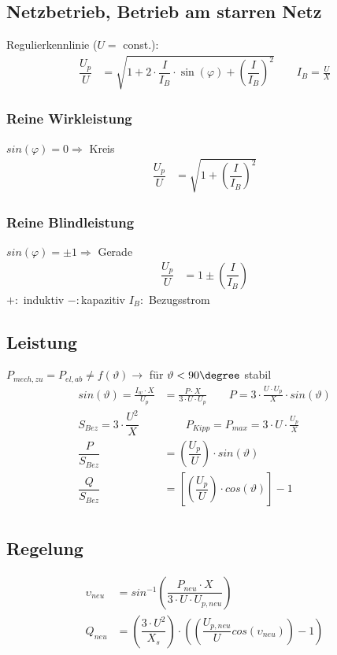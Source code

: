 \subsection{Netzbetrieb, Betrieb am starren Netz}
Regulierkennlinie ($U=$ const.):
\begin{align*}
    \dfrac{U_p}{U} &=  \sqrt{1+2\cdot \dfrac{I}{I_B} \cdot \sin(\varphi) + \left( \dfrac{I}{I_B}\right)^2} \qquad I_B = \frac{U}{X}
\end{align*}
\subsubsection{Reine Wirkleistung}
$sin(\varphi) = 0 \Rightarrow$ Kreis
\begin{align*}
    \dfrac{U_p}{U} &= \sqrt{1+ \left(\dfrac{I}{I_B}\right)^2}
\end{align*}

\subsubsection{Reine Blindleistung}
$    sin(\varphi) = \pm1 \Rightarrow$ Gerade
\begin{align*}
    \dfrac{U_p}{U} &= 1 \pm \left(\dfrac{I}{I_B}\right)
\end{align*}
$+ :$ induktiv \qquad $- :$kapazitiv \qquad $I_B :$ Bezugsstrom

\subsection{Leistung}
$P_{mech,zu} = P_{el,ab} \neq f(\vartheta) \rightarrow$ für $\vartheta < 90\degree$ stabil\\
\begin{align*}
    sin(\vartheta) = \frac{I_w\cdot X}{U_p} &= \frac{P\cdot X}{3\cdot U \cdot U_p}  \qquad P = 3 \cdot \frac{U\cdot U_p}{X} \cdot sin(\vartheta)\\
    S_{Bez} = 3 \cdot \dfrac{U^2}{X} & \qquad P_{Kipp} = P_{max} = 3\cdot U \cdot \frac{U_p}{X}\\
    \dfrac{P}{S_{Bez}} &= \left(\dfrac{U_p}{U}\right) \cdot sin(\vartheta)\\
    \dfrac{Q}{S_{Bez}} &= \left[\left(\dfrac{U_p}{U}\right) \cdot cos(\vartheta)\right] -1\\
\end{align*}

\subsection{Regelung}
\begin{align*}
    \upsilon_{neu} &= sin^{-1}\left( \dfrac{P_{neu} \cdot X}{3 \cdot U \cdot U_{p,neu}}\right)\\
    Q_{neu} &= \left( \dfrac{3 \cdot U^2}{X_s}\right) \cdot \left( \left( \dfrac{U_{p,neu}}{U} cos( \upsilon_{neu})\right)-1\right)
\end{align*}

